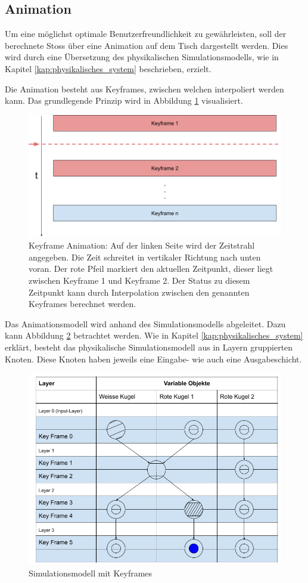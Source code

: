 \subsection{Animation}
Um eine möglichst optimale Benutzerfreundlichkeit zu gewährleisten, soll der berechnete Stoss über eine Animation
auf dem Tisch dargestellt werden. Dies wird durch eine Übersetzung des physikalischen Simulationsmodells, wie in Kapitel
\ref{kap:physikalisches_system} beschrieben, erzielt.

Die Animation besteht aus Keyframes, zwischen welchen interpoliert werden kann. Das grundlegende Prinzip wird in Abbildung
\ref{fig:keyframe_animation} visualisiert.

\begin{figure}[h!]
    \begin{center}
        \includegraphics[width=0.6\linewidth]{../common/03_billiard_ai/resources/31_keyframe_animation.png}
    \end{center}
    \caption{Keyframe Animation: Auf der linken Seite wird der Zeitstrahl angegeben. Die Zeit schreitet in vertikaler
    Richtung nach unten voran. Der rote Pfeil markiert den aktuellen Zeitpunkt, dieser liegt zwischen Keyframe 1 und Keyframe 2.
    Der Status zu diesem Zeitpunkt kann durch Interpolation zwischen den genannten Keyframes berechnet werden.}
    \label{fig:keyframe_animation}
\end{figure}

Das Animationsmodell wird anhand des Simulationsmodells abgeleitet. Dazu kann Abbildung
\ref{fig:simulationsmodell_keyframes} betrachtet werden. Wie in Kapitel \ref{kap:physikalisches_system} erklärt, besteht
das physikalische Simulationsmodell aus in Layern gruppierten Knoten. Diese Knoten haben jeweils eine Eingabe- wie auch
eine Ausgabeschicht.

\begin{figure}[h!]
    \begin{center}
        \includegraphics[width=0.6\linewidth]{../common/03_billiard_ai/resources/18_animation_keyframes.png}
    \end{center}
    \caption{Simulationsmodell mit Keyframes}
    \label{fig:simulationsmodell_keyframes}
\end{figure}

